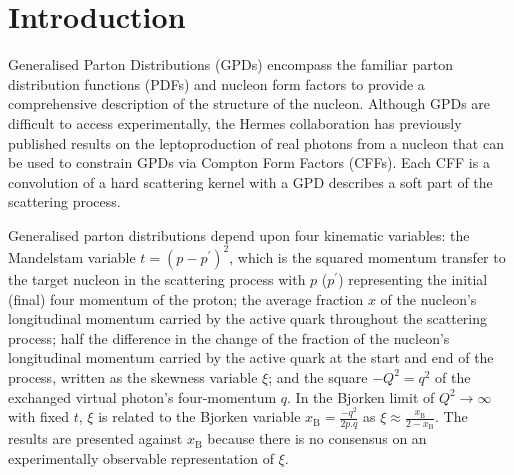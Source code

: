 \section{Introduction}
Generalised Parton Distributions (GPDs)
\cite{Mue94,Ji97a,Rad97} encompass the familiar parton
distribution functions (PDFs) and nucleon form factors to provide a
comprehensive description of the structure of the nucleon.
Although GPDs are difficult to access experimentally, the H{\sc ermes}
collaboration has previously published results
\cite{Air06,Air08,Air09,Air10,Air10a} on
the leptoproduction of real photons from a nucleon that can be used to
constrain GPDs via Compton Form Factors (CFFs). Each CFF is a convolution of a
hard scattering kernel with a GPD  describes a soft part of the scattering
process.

Generalised parton distributions depend upon four kinematic variables: the
Mandelstam variable $t=(p-p^{\prime})^2$, which is the squared momentum
transfer to the target nucleon in the scattering process with $p$ ($p^{\prime}$)
representing the initial (final) four momentum of the proton; the average
fraction $x$ of the nucleon's longitudinal momentum carried by the active
quark throughout the scattering process; half the difference in the
change of the fraction of the nucleon's longitudinal momentum carried by the
active quark at the start and end of the process, written as the skewness
variable $\xi$; and the square $-Q^2=q^2$ of the exchanged virtual photon's
four-momentum $q$. In the Bjorken limit of $Q^2\rightarrow\infty$ with
fixed $t$, $\xi$ is related to the Bjorken variable
$x_{\textrm{B}}=\frac{-q^2}{2p.q}$ as
$\xi\approx\frac{x_\textrm{B}}{2-x_\textrm{B}}$. The results are presented
against $x_{\textrm{B}}$ because there is no consensus on an experimentally
observable representation of $\xi$. 

